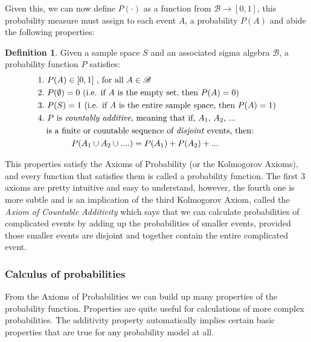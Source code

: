 \documentclass[
  oneside,
  11pt, a4paper,
  footinclude=true,
  headinclude=true,
  cleardoublepage=empty
]{scrbook}
\theoremstyle{definition}
\newtheorem{definition}{Definition}[section]
\theoremstyle{definition}
\begin{document}
                Given this, we can now define $P(\cdot)$ as a function from $\mathscr{B} \rightarrow [0,1]$, this probability measure must assign to each event $A$, a probability $P(A)$ and abide the following properties:
                
                \begin{definition}{Given a sample space $S$ and an associated sigma algebra $\mathscr{B}$, a probability function $P$ satisfies:}
                \begin{align*}
                & 1.\ P(A) \in [0, 1]\ \text{, for all}\ A \in \mathscr{B} \\
                & 2.\ P(\emptyset) = 0\ \text{(i.e. if $A$ is the empty set, then $P(A) = 0$)} \\
                & 3.\ P(S) = 1\ \text{(i.e. if $A$ is the entire sample space, then $P(A) = 1$)} \\
                & 4.\ \text{$P$ is \emph{countably additive}, meaning that if, $A_1$, $A_2$, ...} \\ 
                & \quad \text{is a finite or countable sequence of \emph{disjoint} events, then:}\\
                & \qquad\qquad P(A_1 \cup A_2 \cup ....) = P(A_1) + P(A_2) + \text{...} 
                \end{align*}{}
                \end{definition}{}
                
                This properties satisfy the Axioms of Probability (or the Kolmogorov Axioms), and every function that satisfies them is called a probability function. The first 3 axioms are pretty intuitive and easy to understand, however, the fourth one is more subtle and is an implication of the third Kolmogorov Axiom, called the \emph{Axiom of Countable Additivity} which says that we can calculate probabilities of complicated events by adding up the probabilities of smaller events, provided those smaller events are disjoint and together contain the entire complicated event.
        
        \subsubsection{Calculus of probabilities}
            
            From the Axioms of Probabilities we can build up many properties of the probability function. Properties are quite useful for calculations of more complex probabilities. The additivity property automatically implies certain basic properties that are true for any probability model at all.
            
\end{document}
